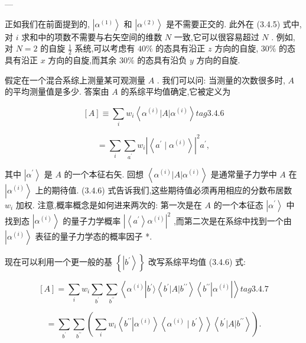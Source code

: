 ---

正如我们在前面提到的, $\left| {\alpha }^{\left( 1\right) }\right\rangle$ 和 $\left| {\alpha }^{\left( 2\right) }\right\rangle$ 是不需要正交的. 此外在 (3.4.5) 式中,对 $i$ 求和中的项数不需要与右矢空间的维数 $N$ 一致,它可以很容易超过 $N$ . 例如,对 $N = 2$ 的自旋 $\frac{1}{2}$ 系统,可以考虑有 ${40}\%$ 的态具有沿正 $z$ 方向的自旋, ${30}\%$ 的态具有沿正 $x$ 方向的自旋,而其余 ${30}\%$ 的态具有沿负 $y$ 方向的自旋.

假定在一个混合系综上测量某可观测量 $A$ . 我们可以问: 当测量的次数很多时, $A$ 的平均测量值是多少. 答案由 $A$ 的系综平均值确定,它被定义为

$$
\left\lbrack A\right\rbrack \equiv \mathop{\sum }\limits_{i}{w}_{i}\left\langle {{\alpha }^{\left( i\right) }\left| A\right| {\alpha }^{\left( i\right) }}\right\rangle tag{3. 4.6}
$$

$$
= \mathop{\sum }\limits_{i}\mathop{\sum }\limits_{{a}^{\prime }}{w}_{i}{\left| \left\langle {a}^{\prime } \mid {\alpha }^{\left( i\right) }\right\rangle \right| }^{2}{a}^{\prime },
$$

其中 $\left| {\alpha }^{\prime }\right\rangle$ 是 $A$ 的一个本征右矢. 回想 $\left\langle {{\alpha }^{\left( i\right) }\left| A\right| {\alpha }^{\left( i\right) }}\right\rangle$ 是通常量子力学中 $A$ 在 $\left| {\alpha }^{\left( i\right) }\right\rangle$ 上的期待值. (3.4.6) 式告诉我们,这些期待值必须再用相应的分数布居数 ${w}_{i}$ 加权. 注意,概率概念是如何进来两次的: 第一次是在 $A$ 的一个本征态 $\left| {\alpha }^{\prime }\right\rangle$ 中找到态 $\left| {\alpha }^{\left( i\right) }\right\rangle$ 的量子力学概率 ${\left| \left\langle {a}^{\prime }\right\rangle {\alpha }^{\left( i\right) }\right| }^{2}$ ,而第二次是在系综中找到一个由 $\left| {\alpha }^{\left( i\right) }\right\rangle$ 表征的量子力学态的概率因子 *.

现在可以利用一个更一般的基 $\left\{ \left| {b}^{\prime }\right\rangle \right\}$ 改写系综平均值 (3.4.6) 式:

$$
\left\lbrack A\right\rbrack = \mathop{\sum }\limits_{i}{w}_{i}\mathop{\sum }\limits_{{b}^{\prime }}\mathop{\sum }\limits_{{b}^{\prime \prime }}\left\langle {{\alpha }^{\left( i\right) }\left| {{b}^{\prime }\rangle \left\langle {{b}^{\prime }\left| A\right| {b}^{\prime \prime }}\right\rangle \left\langle {b}^{\prime \prime }\right| {\alpha }^{\left( i\right) }}\right| }\right\rangle tag{3.4.7}
$$

$$
= \mathop{\sum }\limits_{{b}^{\prime }}\mathop{\sum }\limits_{{b}^{\prime \prime }}\left( {\mathop{\sum }\limits_{i}{w}_{i}\left\langle {{b}^{\prime \prime }\left| {\alpha }^{\left( i\right) }\right\rangle \left\langle {{\alpha }^{\left( i\right) } \mid {b}^{\prime }}\right\rangle }\right\rangle \left\langle {{b}^{\prime }\left| A\right| {b}^{\prime \prime }}\right\rangle }\right) .
$$

